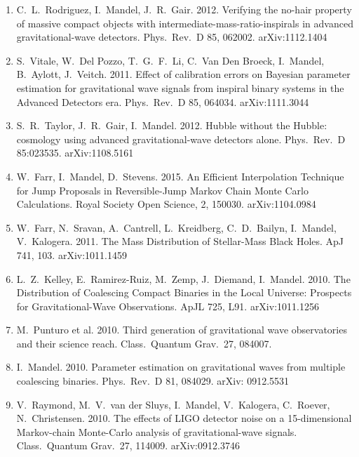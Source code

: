 \documentclass[margin,line]{res}
\begin{document}
\begin{resume}
\begin{enumerate}
\item  C.~L.~Rodriguez, I.~Mandel, J.~R.~Gair.  2012. Verifying the no-hair property of massive compact objects with intermediate-mass-ratio-inspirals in advanced gravitational-wave detectors. Phys.~Rev.~D 85, 062002. arXiv:1112.1404

\item  S.~Vitale, W.~Del Pozzo, T.~G.~F.~Li, C.~Van Den Broeck, I.~Mandel, B.~Aylott, J.~Veitch.  2011.  Effect of calibration errors on Bayesian parameter estimation for gravitational wave signals from inspiral binary systems in the Advanced Detectors era.  Phys.~Rev.~D 85, 064034. arXiv:1111.3044
 
\item  S.~R.~Taylor, J.~R.~Gair, I.~Mandel. 2012. Hubble without the Hubble: cosmology using advanced gravitational-wave detectors alone. Phys.~Rev.~D 85:023535. arXiv:1108.5161 

\item  W.~Farr, I.~Mandel, D.~Stevens. 2015.  An Efficient Interpolation Technique for Jump Proposals in Reversible-Jump Markov Chain Monte Carlo Calculations.  Royal Society Open Science, 2, 150030. arXiv:1104.0984

\item  W.~Farr, N.~Sravan, A.~Cantrell, L.~Kreidberg, C.~D.~Bailyn, I.~Mandel, V.~Kalogera. 2011. The Mass Distribution of Stellar-Mass Black Holes. ApJ 741, 103. arXiv:1011.1459

\item  L.~Z.~Kelley, E.~Ramirez-Ruiz, M.~Zemp, J.~Diemand, I.~Mandel. 2010. The Distribution of Coalescing Compact Binaries in the Local Universe: Prospects for Gravitational-Wave Observations. ApJL 725, L91.  arXiv:1011.1256

\item  M.~Punturo et al. 2010. Third generation of gravitational wave observatories and their science reach.  Class.~Quantum Grav.~27, 084007.

\item  I.~Mandel. 2010.  Parameter estimation on gravitational waves from multiple coalescing binaries.  Phys.~Rev.~D 81, 084029. arXiv: 0912.5531

\item  V.~Raymond, M.~V.~van der Sluys, I.~Mandel, V.~Kalogera, C.~Roever, N.~Christensen. 2010. The effects of LIGO detector noise on a 15-dimensional Markov-chain Monte-Carlo analysis of gravitational-wave signals.  Class.~Quantum Grav.~27, 114009. arXiv:0912.3746


\end{enumerate}
\end{resume}
\end{document}
